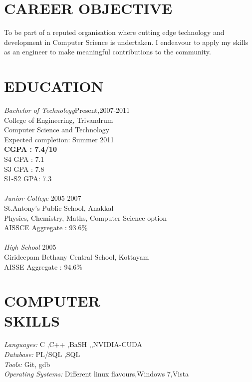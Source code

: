 \documentclass[line,margin]{res}
\begin{document}
\name{\color{lb}{Yadu Nand B}}

\address{\color{db}{yadudoc1729@gmail.com}\\}
\address{ +91 94477 80725}


 
\begin{resume}
 
\section{CAREER OBJECTIVE}
    To be part of a reputed organisation where cutting edge 
    technology and development in Computer Science is undertaken.
    I endeavour to apply my skills as an engineer to make 
    meaningful contributions to the community.       
 
\section{EDUCATION} {\sl Bachelor of Technology}\hfill Present,2007-2011\\
   College of Engineering, Trivandrum \\
   Computer Science and Technology\\
   Expected completion: Summer 2011\\
   {\bf CGPA  : 7.4/10 }\\
   S4 GPA : 7.1 \\
   S3 GPA : 7.8 \\
   S1-S2 GPA: 7.3\\ 
   \\
   {\sl Junior College} \hfill 2005-2007\\
   St.Antony's Public School, Anakkal\\
   Physics, Chemistry, Maths, Computer Science option\\
   AISSCE Aggregate : 93.6\% \\
   \\
   {\sl High School} \hfill 2005\\
   Girideepam Bethany Central School, Kottayam\\
   AISSE Aggregate : 94.6\% 

\section{COMPUTER \\ SKILLS} {\sl Languages:} C ,C++ ,BaSH ,\LaTeXe ,NVIDIA-CUDA \\
   {\sl Database:} PL/SQL ,SQL\\
   {\sl Tools:} Git, gdb \\
   {\sl Operating Systems:} Dif\mbox{}ferent linux flavours,Windows 7,Vista
 

\end{resume}
\end{document}
